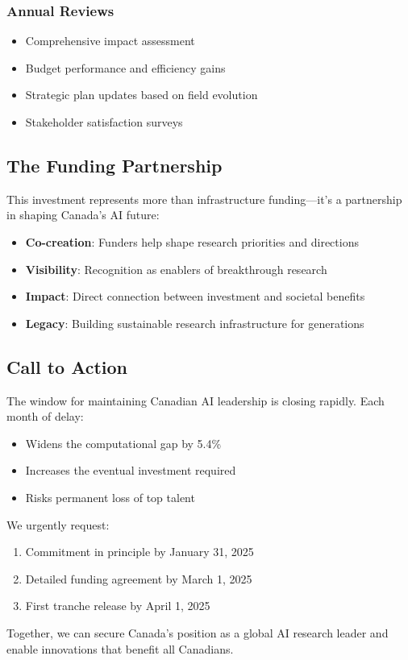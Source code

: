 \subsubsection{Annual Reviews}
\begin{itemize}
\item Comprehensive impact assessment
\item Budget performance and efficiency gains
\item Strategic plan updates based on field evolution
\item Stakeholder satisfaction surveys
\end{itemize}

\subsection{The Funding Partnership}

This investment represents more than infrastructure funding---it's a partnership in shaping Canada's AI future:

\begin{itemize}
\item \textbf{Co-creation}: Funders help shape research priorities and directions
\item \textbf{Visibility}: Recognition as enablers of breakthrough research
\item \textbf{Impact}: Direct connection between investment and societal benefits
\item \textbf{Legacy}: Building sustainable research infrastructure for generations
\end{itemize}

\subsection{Call to Action}

The window for maintaining Canadian AI leadership is closing rapidly. Each month of delay:
\begin{itemize}
\item Widens the computational gap by 5.4\%
\item Increases the eventual investment required
\item Risks permanent loss of top talent
\end{itemize}

We urgently request:
\begin{enumerate}
\item Commitment in principle by January 31, 2025
\item Detailed funding agreement by March 1, 2025
\item First tranche release by April 1, 2025
\end{enumerate}

Together, we can secure Canada's position as a global AI research leader and enable innovations that benefit all Canadians.